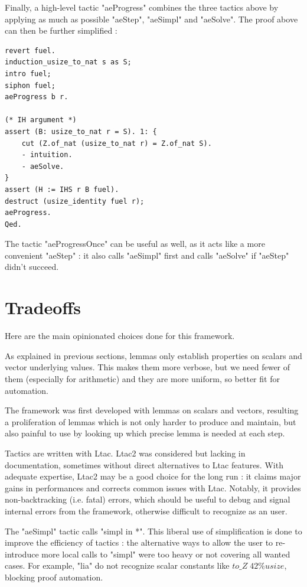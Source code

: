 \documentclass{article}
\begin{document}
Finally, a high-level tactic "aeProgress" combines the three tactics above by applying as much as possible "aeStep", "aeSimpl" and "aeSolve". The proof above can then be further simplified :

\begin{verbatim}
revert fuel.
induction_usize_to_nat s as S;
intro fuel;
siphon fuel;
aeProgress b r.

(* IH argument *)
assert (B: usize_to_nat r = S). 1: {
    cut (Z.of_nat (usize_to_nat r) = Z.of_nat S).
    - intuition.
    - aeSolve.
}
assert (H := IHS r B fuel).
destruct (usize_identity fuel r);
aeProgress.
Qed.
\end{verbatim}

The tactic "aeProgressOnce" can be useful as well, as it acts like a more convenient "aeStep" : it also calls "aeSimpl" first and calls "aeSolve" if "aeStep" didn't succeed.

\section{Tradeoffs}
\label{sec:Tradeoffs}

Here are the main opinionated choices done for this framework.

\medskip

As explained in previous sections, lemmas only establish properties on scalars and vector underlying values. This makes them more verbose, but we need fewer of them (especially for arithmetic) and they are more uniform, so better fit for automation.

The framework was first developed with lemmas on scalars and vectors, resulting a proliferation of lemmas which is not only harder to produce and maintain, but also painful to use by looking up which precise lemma is needed at each step.

\medskip

Tactics are written with Ltac. Ltac2 was considered but lacking in documentation, sometimes without direct alternatives to Ltac features. With adequate expertise, Ltac2 may be a good choice for the long run : it claims major gains in performances and corrects common issues with Ltac. Notably, it provides non-backtracking (i.e. fatal) errors, which should be useful to debug and signal internal errors from the framework, otherwise difficult to recognize as an user.

\medskip

The "aeSimpl" tactic calls "simpl in *". This liberal use of simplification is done to improve the efficiency of tactics : the alternative ways to allow the user to re-introduce more local calls to "simpl" were too heavy or not covering all wanted cases. For example, "lia" do not recognize scalar constants like $to\_Z \; 42\%usize$, blocking proof automation.
\end{document}
